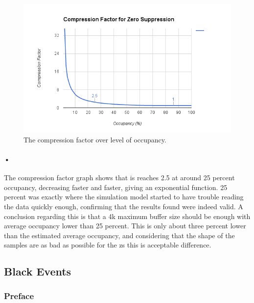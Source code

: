 \documentclass[a4paper, 12pt, openright, twoside]{report}
\begin{document}
\begin{figure}[h!]
	\centering
		\includegraphics[width=1.0\textwidth]{images/comp-factor-results.png}
		\caption{The compression factor over level of occupancy.}
		\label{fig:comp-factor-results}
\end{figure}

\paragraph{•}
The compression factor graph shows that is reaches 2.5 at around 25 percent occupancy, decreasing faster and faster, giving an exponential function.
25 percent was exactly where the simulation model started to have trouble reading the data quickly enough, confirming that the results found were indeed valid.
A conclusion regarding this is that a 4k maximum buffer size should be enough with average occupancy lower than 25 percent.
This is only about three percent lower than the estimated average occupancy, and considering that the shape of the samples are as bad as possible for the \gls{zs} this is acceptable difference.


\subsection{Black Events}

\subsubsection{Preface}
\end{document}
